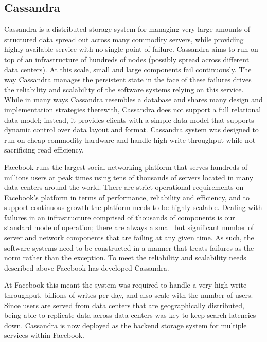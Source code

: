 \documentclass[a4paper]{article}
\begin{document}
\subsection{Cassandra} 
Cassandra\cite{cassandra} is a distributed storage system for managing very
large amounts of structured data spread out across many
commodity servers, while providing highly available service
with no single point of failure. Cassandra aims to run on top
of an infrastructure of hundreds of nodes (possibly spread
across different data centers). At this scale, small and large
components fail continuously. The way Cassandra manages
the persistent state in the face of these failures drives
the reliability and scalability of the software systems relying
on this service. While in many ways Cassandra resembles
a database and shares many design and implementation
strategies therewith, Cassandra does not support a full relational
data model; instead, it provides clients with a simple
data model that supports dynamic control over data layout
and format. Cassandra system was designed to run on
cheap commodity hardware and handle high write throughput
while not sacrificing read efficiency.

Facebook\cite{facebooksite} runs the largest social networking
platform that serves hundreds of millions users at peak times using
tens of thousands of servers located in many data centers around
the world. There are strict operational requirements on
Facebook's platform in terms of performance, reliability and
efficiency, and to support continuous growth the platform
needs to be highly scalable. Dealing with failures in an
infrastructure comprised of thousands of components is our
standard mode of operation; there are always a small but
significant number of server and network components that
are failing at any given time. As such, the software systems
need to be constructed in a manner that treats failures as the
norm rather than the exception. To meet the reliability and
scalability needs described above Facebook has developed
Cassandra.

At Facebook this meant the system was required to handle a very high
write throughput, billions of writes per day, and also scale with the
number of users. Since users are served from data centers that are
geographically distributed, being able to replicate data across data
centers was key to keep search latencies down. Cassandra is now deployed
as the backend storage system for multiple services within
Facebook.
\end{document}
